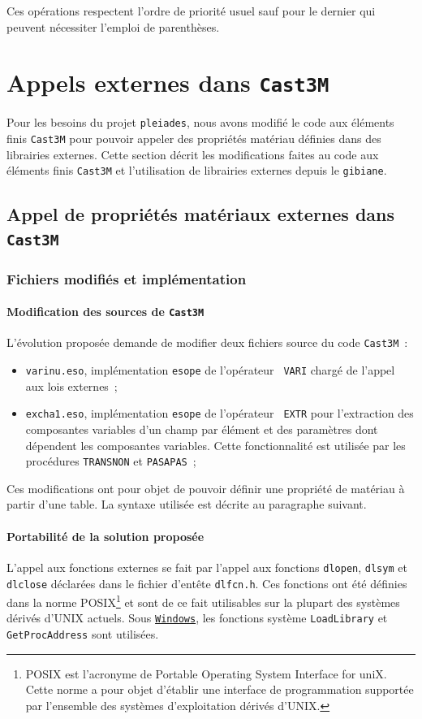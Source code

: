 \documentclass[rectoverso,pleiades,pstricks,leqno,anti]{texmf/note_technique_2010}
\newcommand{\pleiades}{\texttt{pleiades}}
\newcommand{\castem}{\texttt{Cast3M}}
\newcommand{\windows}{\href{http://www.microsoft.com/france/windows/default.mspx}{\texttt{Windows}}}
\begin{document}
Ces opérations respectent l'ordre de priorité usuel sauf pour le
dernier qui peuvent nécessiter l'emploi de parenthèses.


\clearpage
\newpage
\section{Appels externes dans \castem{}}

Pour les besoins du projet \pleiades{}, nous avons modifié le code aux
éléments finis \castem{} pour pouvoir appeler des propriétés matériau
définies dans des librairies externes. Cette section décrit les
modifications faites au code aux éléments finis \castem{} et
l'utilisation de librairies externes depuis le {\tt gibiane}.

\subsection{Appel de propriétés matériaux externes dans \castem{}}

\subsubsection{Fichiers modifiés et implémentation}

\paragraph{Modification des sources de \castem{}} L'évolution proposée
demande de modifier deux fichiers source du code \castem{}~:
\begin{itemize}
  \item {\tt varinu.eso}, implémentation {\tt esope} de l'opérateur {\tt
    VARI} chargé de l'appel aux lois externes~;
  \item {\tt excha1.eso}, implémentation {\tt esope} de l'opérateur {\tt
    EXTR} pour l'extraction des composantes variables d'un champ par
  élément et des paramètres dont dépendent les composantes variables.
  Cette fonctionnalité est utilisée par les procédures {\tt TRANSNON} et
  {\tt PASAPAS}~;
\end{itemize}
Ces modifications ont pour objet de pouvoir définir une propriété de
matériau à partir d'une table. La syntaxe utilisée est décrite au
paragraphe suivant.

\paragraph{Portabilité de la solution proposée} L'appel aux fonctions
externes se fait par l'appel aux fonctions {\tt dlopen}, {\tt dlsym} et
{\tt dlclose} déclarées dans le fichier d'entête {\tt dlfcn.h}. Ces
fonctions ont été définies dans la norme POSIX\footnote{POSIX est
  l'acronyme de Portable Operating System Interface for uniX. Cette
  norme a pour objet d'établir une interface de programmation supportée
  par l'ensemble des systèmes d'exploitation dérivés d'UNIX.} et sont de
ce fait utilisables sur la plupart des systèmes dérivés d'UNIX actuels.
Sous \windows{}, les fonctions système {\tt Load\-Library} et {\tt
  Get\-Proc\-Address} sont utilisées.
\end{document}
